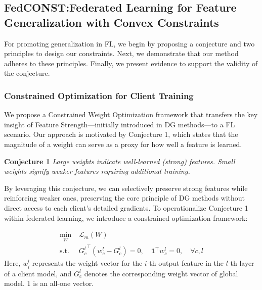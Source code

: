\documentclass{article}
\theoremstyle{plain}
\theoremstyle{definition}
\theoremstyle{remark}
\begin{document}
\subsection{FedCONST:Federated Learning for Feature Generalization with Convex Constraints}
For promoting generalization in FL, we begin by proposing a conjecture and two principles to design our constraints. Next, we demonstrate that our method adheres to these principles. Finally, we present evidence to support the validity of the conjecture.
\subsubsection{Constrained Optimization for Client Training}
We propose a Constrained Weight Optimization framework that transfers the key insight of Feature Strength—initially introduced in DG methods—to a FL scenario. Our approach is motivated by Conjecture 1, which states that the magnitude of a weight can serve as a proxy for how well a feature is learned.

\textbf{Conjecture 1} \textit{Large weights indicate well-learned (strong) features. Small weights signify weaker features requiring additional training.}

By leveraging this conjecture, we can selectively preserve strong features while reinforcing weaker ones, preserving the core principle of DG methods without direct access to each client’s detailed gradients.
To operationalize Conjecture 1 within federated learning, we introduce a constrained optimization framework:

\begin{equation}
\begin{aligned}
\min_W\ &\mathcal{L}_{m}(W) \\
\text{s.t. } & {G_c^l}^\top (w_c^l - G_c^l) = 0,\quad \mathbf{1}^\top w_c^l = 0,\quad \forall c, l
\end{aligned}
\label{eq:oriconst}
\end{equation}
Here, $w_i^l$ represents the weight vector for the $i$-th output feature in the $l$-th layer of a client model, and $G_c^l$ denotes the corresponding weight vector of global model. $1$ is an all-one vector.  %
\end{document}
